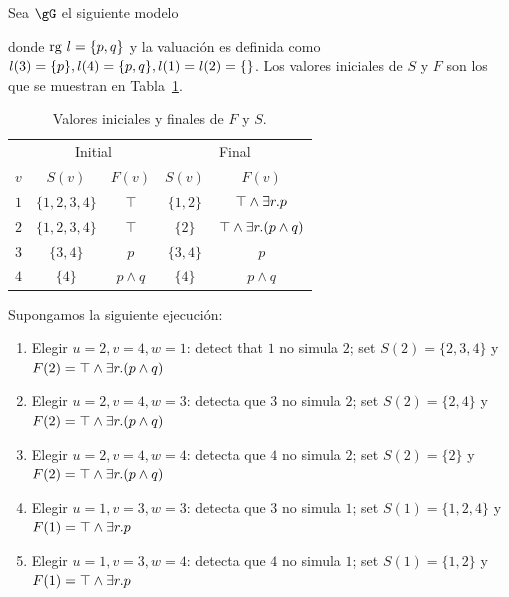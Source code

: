 \begin{ex}
Sea $\gG$ el siguiente modelo
\begin{center}
\end{center}
%
donde ${\rm rg}\ l=\{p,q\}$ y la valuaci\'on es definida como
$l(3)=\{p\}, l(4)=\{p,q\}, l(1)=l(2)=\{\}$. Los valores iniciales de $S$ y $F$ son los que se muestran en
Tabla~\ref{tab:example}.

\begin{table}[ht]
\centering
{\footnotesize
\begin{tabular}{|c|c|c|c|c|}
\hline
&\multicolumn{2}{|c|}{Initial}&\multicolumn{2}{|c|}{Final}\\
$v$ & $S(v)$ & $F(v)$ & $S(v)$&$F(v)$\\
\hline
$1$ & $\{1,2,3,4\}$ & $\top$ & $\{1,2\}$&$\top\wedge\exists r. p$\\
$2$ & $\{1,2,3,4\}$ & $\top$ & $\{2\}$&$\top\wedge\exists r.(p\wedge q)$\\
$3$ & $\{3,4\}$ & $p$ & $\{3,4\}$ &$p$\\
$4$ & $\{4\}$ & $p\wedge q$ & $\{4\}$&$p\wedge q$\\
\hline
\end{tabular}
\caption{Valores iniciales y finales de $F$ y $S$.}\label{tab:example}
}
\end{table}

Supongamos la siguiente ejecuci\'on:
\begin{enumerate}
\item Elegir $u=2,v=4,w=1$: detect that $1$ no simula $2$; set $S(2)=\{2,3,4\}$ y $F(2)=\top\wedge\exists r.(p\wedge q)$
\item Elegir $u=2,v=4,w=3$: detecta que $3$ no simula $2$; set $S(2)=\{2,4\}$ y $F(2)=\top\wedge\exists r.(p\wedge q)$
\item Elegir $u=2,v=4,w=4$: detecta que $4$ no simula $2$; set $S(2)=\{2\}$ y $F(2)=\top\wedge\exists r.(p\wedge q)$
\item Elegir $u=1,v=3,w=3$: detecta que $3$ no simula $1$; set $S(1)=\{1,2,4\}$ y $F(1)=\top\wedge\exists r. p$
\item Elegir $u=1,v=3,w=4$: detecta que $4$ no simula $1$; set $S(1)=\{1,2\}$ y $F(1)=\top\wedge\exists r. p$
\end{enumerate}


\end{ex}
